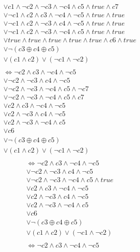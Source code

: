 \documentclass{scrartcl}
\begin{document}
\begin{itemize}
\begin{align*}
    &\lor c1 \land ¬c2 \land ¬c3 \land ¬c4 \land c5 \land true \land c7\\
    &\lor ¬c1 \land c2 \land c3 \land ¬c4 \land ¬c5 \land true \land true\\
    &\lor ¬c1 \land c2 \land ¬c3 \land c4 \land ¬c5 \land true \land true\\
    &\lor ¬c1 \land c2 \land ¬c3 \land ¬c4 \land c5 \land true \land true\\
    &\lor true \land true \land true \land true \land true \land c6 \land true\\
    &\lor ¬(c3 \oplus c4 \oplus c5)\\
    &\lor (c1 \land c2 )\lor(¬c1 \land ¬c2)\\\\
    &\Leftrightarrow ¬c2 \land c3 \land ¬c4 \land ¬c5\\
    &\lor ¬c2 \land ¬c3 \land c4 \land ¬c5 \\
    &\lor ¬c2 \land ¬c3 \land ¬c4 \land c5 \land ¬c7\\
    &\lor ¬c2 \land ¬c3 \land ¬c4 \land c5 \land c7\\
    &\lor c2 \land c3 \land ¬c4 \land ¬c5 \\
    &\lor c2 \land ¬c3 \land c4 \land ¬c5 \\
    &\lor c2 \land ¬c3 \land ¬c4 \land c5 \\
    &\lor c6\\
    &\lor ¬(c3 \oplus c4 \oplus c5)\\
    &\lor (c1 \land c2 )\lor(¬c1 \land ¬c2)\\
    \end{align*}
    \newpage
    \begin{align*}
    &\Leftrightarrow ¬c2 \land c3 \land ¬c4 \land ¬c5\\
    &\lor ¬c2 \land ¬c3 \land c4 \land ¬c5 \\
    &\lor ¬c2 \land ¬c3 \land ¬c4 \land c5 \land true\\
    &\lor c2 \land c3 \land ¬c4 \land ¬c5 \\
    &\lor c2 \land ¬c3 \land c4 \land ¬c5 \\
    &\lor c2 \land ¬c3 \land ¬c4 \land c5 \\
    &\lor c6\\
    &\lor ¬(c3 \oplus c4 \oplus c5)\\
    &\lor (c1 \land c2 )\lor(¬c1 \land ¬c2)\\\\
	&\Leftrightarrow ¬c2 \land c3 \land ¬c4 \land ¬c5\\

\end{align*}
\end{itemize}
\end{document}
